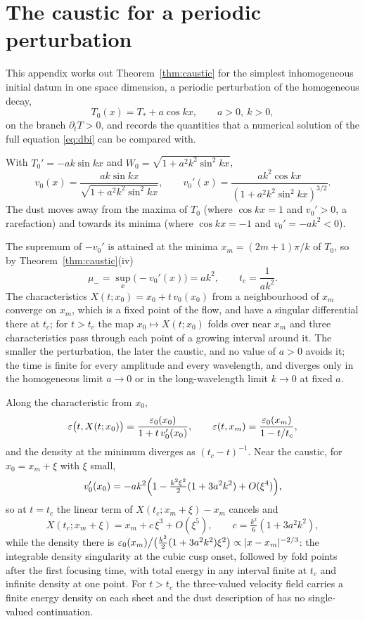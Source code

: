 \section{The caustic for a periodic perturbation}\label{app:dust}

This appendix works out Theorem~\ref{thm:caustic} for the simplest inhomogeneous initial datum in one space dimension, a periodic perturbation of the homogeneous decay,
\begin{equation}\label{eq:cosdatum}
T_0(x) = T_* + a\cos kx,\qquad a>0,\ k>0 ,
\end{equation}
on the branch $\partial_t T>0$, and records the quantities that a numerical solution of the full equation \eqref{eq:dbi} can be compared with.

 With $T_0' = -ak\sin kx$ and $W_0 = \sqrt{1+a^2k^2\sin^2kx}$,
\begin{equation}
v_0(x) = \frac{ak\sin kx}{\sqrt{1+a^2k^2\sin^2 kx}},\qquad
v_0'(x) = \frac{ak^2\cos kx}{(1+a^2k^2\sin^2kx)^{3/2}} .
\end{equation}
The dust moves away from the maxima of $T_0$ (where $\cos kx=1$ and $v_0'>0$, a rarefaction) and towards its minima (where $\cos kx = -1$ and $v_0' = -ak^2<0$).

 The supremum of $-v_0'$ is attained at the minima $x_m = (2m+1)\pi/k$ of $T_0$, so by Theorem~\ref{thm:caustic}(iv)
\begin{equation}\label{eq:tccos}
\mu_- = \sup_x\bigl(-v_0'(x)\bigr) = ak^2, \qquad t_c = \frac{1}{a k^2} .
\end{equation}
The characteristics $X(t;x_0) = x_0 + t\,v_0(x_0)$ from a neighbourhood of $x_m$ converge on $x_m$, which is a fixed point of the flow, and have a singular differential there at $t_c$; for $t>t_c$ the map $x_0\mapsto X(t;x_0)$ folds over near $x_m$ and three characteristics pass through each point of a growing interval around it. The smaller the perturbation, the later the caustic, and no value of $a>0$ avoids it; the time is finite for every amplitude and every wavelength, and diverges only in the homogeneous limit $a\to0$ or in the long-wavelength limit $k\to0$ at fixed $a$.

 Along the characteristic from $x_0$,
\[
\varepsilon\bigl(t,X(t;x_0)\bigr) = \frac{\varepsilon_0(x_0)}{1+t\,v_0'(x_0)},\qquad \varepsilon(t,x_m) = \frac{\varepsilon_0(x_m)}{1 - t/t_c},
\]
and the density at the minimum diverges as $(t_c - t)^{-1}$. Near the caustic, for $x_0 = x_m + \xi$ with $\xi$ small,
\[
v_0'(x_0) = -ak^2\Bigl(1 - \tfrac{k^2\xi^2}{2}(1 + 3a^2k^2)+O(\xi^4)\Bigr),
\]
so at $t=t_c$ the linear term of $X(t_c;x_m+\xi) - x_m$ cancels and
\[
X(t_c;x_m+\xi) = x_m + c\,\xi^3 + O(\xi^5),\qquad c = \tfrac{k^2}{6}(1+3a^2k^2),
\]
while the density there is $\varepsilon_0(x_m)\big/\big(\tfrac{k^2}{2}(1+3a^2k^2)\xi^2\big)\propto |x-x_m|^{-2/3}$: the integrable density singularity at the cubic cusp onset, followed by fold points after the first focusing time, with total energy in any interval finite at $t_c$ and infinite density at one point. For $t>t_c$ the three-valued velocity field carries a finite energy density on each sheet and the dust description of \cite{Sen02field} has no single-valued continuation.

